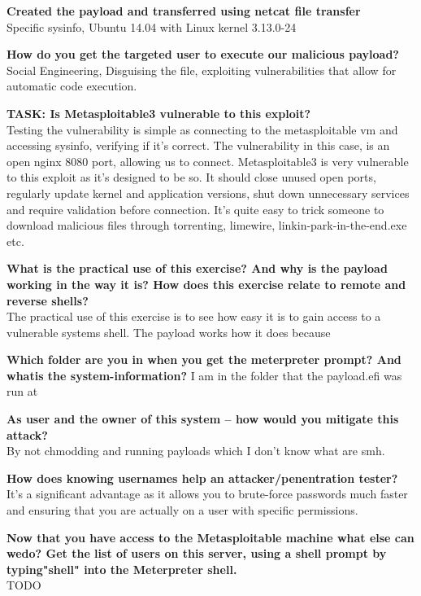 \textbf{Created the payload and transferred using netcat file transfer}\\
Specific sysinfo, Ubuntu 14.04 with Linux kernel 3.13.0-24

\textbf{\dag How do you get the targeted user to execute our malicious payload?}\\
Social Engineering, Disguising the file, exploiting vulnerabilities that allow for automatic code execution.

\textbf{TASK: Is Metasploitable3 vulnerable to this exploit?}\\
Testing the vulnerability is simple as connecting to the metasploitable vm and accessing sysinfo, verifying if it's correct.
The vulnerability in this case, is an open nginx 8080 port, allowing us to connect.
Metasploitable3 is very vulnerable to this exploit as it's designed to be so.
It should close unused open ports, regularly update kernel and application versions, shut down unnecessary services and require validation before connection.
It's quite easy to trick someone to download malicious files through torrenting, limewire, linkin-park-in-the-end.exe etc.

\textbf{\dag What is the practical use of this exercise? And why is the payload working in the way it is? How does this exercise relate to remote and reverse shells?}\\
The practical use of this exercise is to see how easy it is to gain access to a vulnerable systems shell. The payload works how it does because

\textbf{Which folder are you in when you get the meterpreter prompt? And whatis the system-information?}
I am in the folder that the payload.efi was run at

\textbf{\dag As user and the owner of this system -- how would you mitigate this attack?}\\
By not chmodding and running payloads which I don't know what are smh.

\textbf{How does knowing usernames help an attacker/penentration tester?
}\\
It's a significant advantage as it allows you to brute-force passwords much faster and ensuring that you are actually on a user with specific permissions.

\textbf{Now that you have access to the Metasploitable machine what else can wedo? Get the list of users on this server, using a shell prompt by typing"shell" into the Meterpreter shell.}\\
TODO

